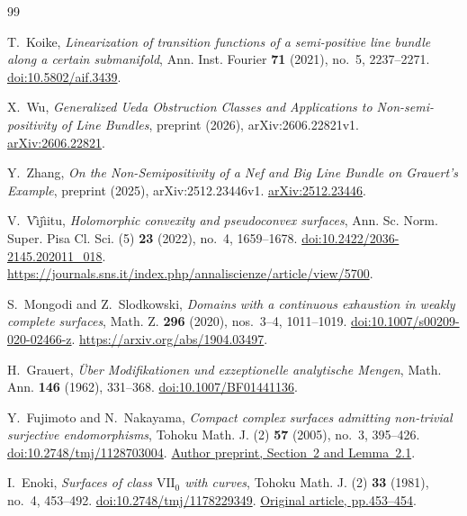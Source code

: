 \documentclass[11pt]{amsart}
\theoremstyle{definition}
\theoremstyle{remark}
\numberwithin{equation}{section}
\begin{document}
\begin{thebibliography}{99}
\raggedright

T.~Koike,
\emph{Linearization of transition functions of a semi-positive line
bundle along a certain submanifold},
Ann. Inst. Fourier \textbf{71} (2021), no.~5, 2237--2271.
\href{https://doi.org/10.5802/aif.3439}{doi:10.5802/aif.3439}.

X.~Wu,
\emph{Generalized Ueda Obstruction Classes and Applications to
Non-semi-positivity of Line Bundles},
preprint (2026), arXiv:2606.22821v1.
\href{https://arxiv.org/abs/2606.22821v1}{arXiv:2606.22821}.

Y.~Zhang,
\emph{On the Non-Semipositivity of a Nef and Big Line Bundle on
Grauert's Example},
preprint (2025), arXiv:2512.23446v1.
\href{https://arxiv.org/abs/2512.23446v1}{arXiv:2512.23446}.

V.~V\^{\i}j\^{\i}itu,
\emph{Holomorphic convexity and pseudoconvex surfaces},
Ann. Sc. Norm. Super. Pisa Cl. Sci. (5) \textbf{23} (2022),
no.~4, 1659--1678.
\href{https://doi.org/10.2422/2036-2145.202011_018}{doi:10.2422/2036-2145.202011\_018}.
\url{https://journals.sns.it/index.php/annaliscienze/article/view/5700}.

S.~Mongodi and Z.~Slodkowski,
\emph{Domains with a continuous exhaustion in weakly complete surfaces},
Math. Z. \textbf{296} (2020), nos.~3--4, 1011--1019.
\href{https://doi.org/10.1007/s00209-020-02466-z}{doi:10.1007/s00209-020-02466-z}.
\url{https://arxiv.org/abs/1904.03497}.

H.~Grauert,
\emph{\"Uber Modifikationen und exzeptionelle analytische Mengen},
Math. Ann. \textbf{146} (1962), 331--368.
\href{https://doi.org/10.1007/BF01441136}{doi:10.1007/BF01441136}.

Y.~Fujimoto and N.~Nakayama,
\emph{Compact complex surfaces admitting non-trivial surjective endomorphisms},
Tohoku Math. J. (2) \textbf{57} (2005), no.~3, 395--426.
\href{https://doi.org/10.2748/tmj/1128703004}{doi:10.2748/tmj/1128703004}.
\href{https://www.kurims.kyoto-u.ac.jp/preprint/file/RIMS1431.pdf}{Author preprint, Section~2 and Lemma~2.1}.

I.~Enoki, \emph{Surfaces of class $\mathrm{VII}_0$ with curves}, Tohoku Math. J. (2)
\textbf{33} (1981), no.~4, 453--492.
\href{https://doi.org/10.2748/tmj/1178229349}{doi:10.2748/tmj/1178229349}.
\href{https://www.jstage.jst.go.jp/article/tmj1949/33/4/33_4_453/_pdf/-char/en}{Original article, pp.453--454}.


\end{thebibliography}
\end{document}
